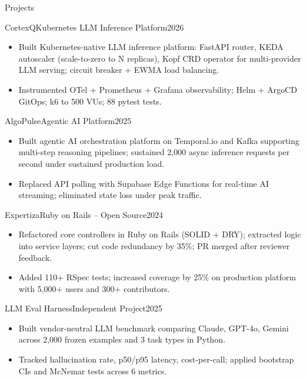 \documentclass[]{mcdowellcv}
\begin{document}
\begin{cvsection}{Projects}
  \begin{cvsubsection}{CortexQ}{Kubernetes LLM Inference Platform}{2026}
    \begin{itemize}
      \item Built Kubernetes-native LLM inference platform: FastAPI router, KEDA autoscaler (scale-to-zero to N replicas), Kopf CRD operator for multi-provider LLM serving; circuit breaker + EWMA load balancing.
      \item Instrumented OTel + Prometheus + Grafana observability; Helm + ArgoCD GitOps; k6 to 500 VUs; 88 pytest tests.
    \end{itemize}
    \vspace{-1.5pt}
  \end{cvsubsection}

  \begin{cvsubsection}{AlgoPulse}{Agentic AI Platform}{2025}
    \begin{itemize}
      \item Built agentic AI orchestration platform on Temporal.io and Kafka supporting multi-step reasoning pipelines; sustained 2,000 async inference requests per second under sustained production load.
      \item Replaced API polling with Supabase Edge Functions for real-time AI streaming; eliminated state loss under peak traffic.
    \end{itemize}
    \vspace{-1.5pt}
  \end{cvsubsection}

  \begin{cvsubsection}{Expertiza}{Ruby on Rails -- Open Source}{2024}
    \begin{itemize}
      \item Refactored core controllers in Ruby on Rails (SOLID + DRY); extracted logic into service layers; cut code redundancy by 35\%; PR merged after reviewer feedback.
      \item Added 110+ RSpec tests; increased coverage by 25\% on production platform with 5,000+ users and 300+ contributors.
    \end{itemize}
    \vspace{-1.5pt}
  \end{cvsubsection}

  \begin{cvsubsection}{LLM Eval Harness}{Independent Project}{2025}
    \begin{itemize}
      \item Built vendor-neutral LLM benchmark comparing Claude, GPT-4o, Gemini across 2,000 frozen examples and 3 task types in Python.
      \item Tracked hallucination rate, p50/p95 latency, cost-per-call; applied bootstrap CIs and McNemar tests across 6 metrics.
    \end{itemize}
  \end{cvsubsection}
\end{cvsection}
\end{document}
